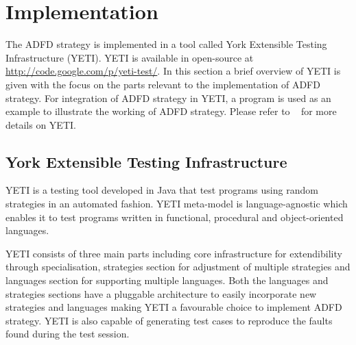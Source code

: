 


\section{Implementation}\label{sec:implementation}
The ADFD strategy is implemented in a tool called York Extensible Testing Infrastructure (YETI). YETI is available in open-source at \url{http://code.google.com/p/yeti-test/}. In this section a brief overview of YETI is given with the focus on the parts relevant to the implementation of ADFD strategy. For integration of ADFD strategy in YETI, a program is used as an example to illustrate the working of ADFD strategy. Please refer to ~\cite{Oriol2011, Oriol2012, Oriol2010, Oriol2010b} for more details on YETI.

\subsection{York Extensible Testing Infrastructure}
YETI is a testing tool developed in Java that test programs using random strategies in an automated fashion. YETI meta-model is language-agnostic which enables it to test programs written in functional, procedural and object-oriented languages.

YETI consists of three main parts including core infrastructure for extendibility through specialisation, strategies section for adjustment of multiple strategies and languages section for supporting multiple languages. Both the languages and strategies sections have a pluggable architecture to easily incorporate new strategies and languages making YETI a favourable choice to implement ADFD strategy. YETI is also capable of generating test cases to reproduce the faults found during the test session.
 
